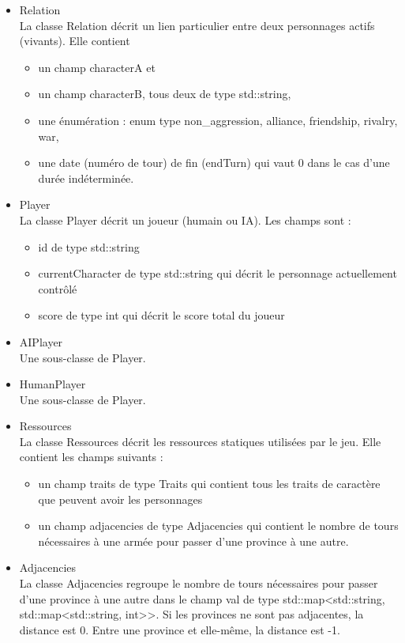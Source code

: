 \documentclass[a4paper,12pt]{article}
\begin{document}
\begin{itemize}
\item Relation\\
La classe Relation décrit un lien particulier entre deux personnages actifs (vivants). Elle contient 
\begin{itemize}
\item un champ characterA et 
\item un champ characterB, tous deux de type std::string,
\item une énumération : enum type {non\_aggression, alliance, friendship, rivalry, war}, 
\item une date (numéro de tour) de fin (endTurn) qui vaut 0 dans le cas d'une durée indéterminée.
\end{itemize}
\item Player\\
La classe Player décrit un joueur (humain ou IA).
Les champs sont :
\begin{itemize}
\item id de type std::string
\item currentCharacter de type std::string qui décrit le personnage actuellement contrôlé
\item score de type int qui décrit  le score total du joueur
\end{itemize}
\item AIPlayer\\
Une sous-classe de Player.
\item HumanPlayer\\
Une sous-classe de Player.
\item Ressources\\
La classe Ressources décrit les ressources statiques utilisées par le jeu. Elle contient les champs suivants :
\begin{itemize}
\item un champ traits de type Traits qui contient tous les traits de caractère que peuvent avoir les personnages
\item un champ adjacencies de type Adjacencies qui contient le nombre de tours nécessaires à une armée pour passer d'une province à une autre.
\end{itemize}
\item Adjacencies\\
La classe Adjacencies regroupe le nombre de tours nécessaires pour passer d'une province à une autre dans le champ val de type std::map<std::string, std::map<std::string, int>>. Si les provinces ne sont pas adjacentes, la distance est 0. Entre une province et elle-même, la distance est -1.

\end{itemize}
\end{document}
